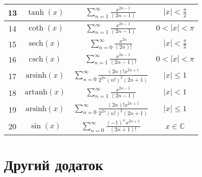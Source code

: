 \begin{table}[h!]
\begin{tabular}{|c|c||c||c|}
			\hline
			13 & \( \tanh(x) \) & \( \displaystyle\sum_{n=1}^{\infty} \frac{x^{2n-1}}{(2n-1)} \) & \( |x| < \frac{\pi}{2} \) \\
			\hline
			14 & \( \coth(x) \) & \( \displaystyle\sum_{n=1}^{\infty} \frac{x^{2n-1}}{(2n-1)} \) & \( 0 < |x| < \pi \) \\
			\hline
			15 & \( \text{sech}(x) \) & \( \displaystyle\sum_{n=0}^{\infty} \frac{x^{2n}}{(2n)!} \) & \( |x| < \frac{\pi}{2} \) \\
			\hline
			16 & \( \text{csch}(x) \) & \( \displaystyle\sum_{n=1}^{\infty} \frac{x^{2n-1}}{(2n-1)!} \) & \( 0 < |x| < \pi \) \\
			\hline
			17 & \( \text{arsinh}(x) \) & \( \displaystyle\sum_{n=0}^{\infty} \frac{(2n)! x^{2n+1}}{2^{2n} (n!)^2 (2n+1)} \) & \( |x| \leq 1 \) \\
			\hline
			18 & \( \text{artanh}(x) \) & \( \displaystyle\sum_{n=1}^{\infty} \frac{x^{2n-1}}{(2n-1)} \) & \( |x| < 1 \) \\
			\hline
			19 & \( \text{arsinh}(x) \) & \( \displaystyle\sum_{n=0}^{\infty} \frac{(2n)! x^{2n+1}}{2^{2n} (n!)^2 (2n+1)} \) & \( |x| \leq 1 \) \\
			\hline
			20 & \( \sin(x) \) & \( \displaystyle\sum_{n=0}^{\infty} \frac{(-1)^n x^{2n+1}}{(2n+1)!} \) & \( x \in \mathbb{C} \) \\
			\hline
		\end{tabular}
	\end{table}
	
	\newpage	
	\section{Другий додаток}\label{sec:appendix2}
	
